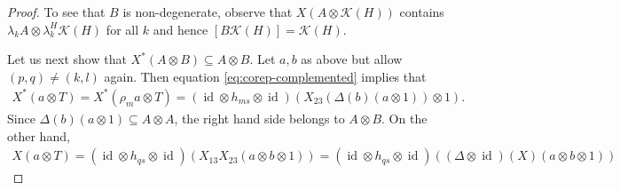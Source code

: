 \documentclass[11pt]{article}
\DeclareMathOperator{\id}{id}
\theoremstyle{definition}
\numberwithin{equation}{section}
\begin{document}
\begin{proof}
To see that $B$ is non-degenerate, observe that $X(A\otimes
\mathcal{K}(H))$ contains $\lambda_{k}A \otimes
\lambda_{k}^{H}\mathcal{K}(H)$ for all $k$ and hence
$[B\mathcal{K}(H)]=\mathcal{K}(H)$.


Let us next show that $X^{*}(A\otimes B)\subseteq A\otimes
B$. Let $a,b$ as above but allow $(p,q)\neq (k,l)$ again. Then
equation \eqref{eq:corep-complemented}  implies that
\begin{align*}
  X^{*}(a\otimes T) = X^{*}(\rho_{m}a\otimes T) = (\id \otimes h_{ms}
  \otimes \id)(X_{23}(\Delta(b)(a\otimes 1))\otimes 1).
\end{align*}
Since $\Delta(b)(a\otimes 1) \subseteq A\otimes A$, the right hand
side belongs to $A\otimes B$.
On the other hand,
\begin{align*}
  X(a\otimes T) = (\id \otimes h_{qs} \otimes
  \id)(X_{13}X_{23}(a\otimes b\otimes 1)) = (\id \otimes h_{qs}
  \otimes \id)((\Delta \otimes \id)(X)(a\otimes b\otimes 1)) 
\end{align*}
  \end{proof}
\end{document}
